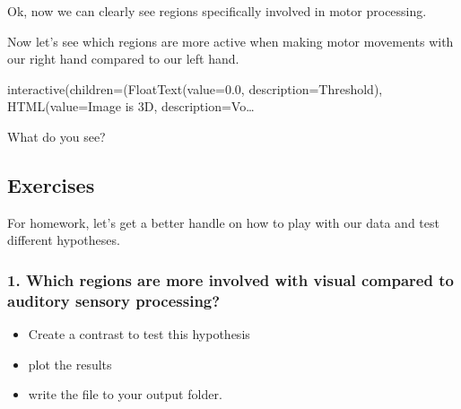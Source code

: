 \documentclass[letterpaper,10pt,english]{sphinxmanual}
\begin{document}
Ok, now we can clearly see regions specifically involved in motor processing.

Now let’s see which regions are more active when making motor movements with our right hand compared to our left hand.

\begin{sphinxVerbatim}[commandchars=\\\{\}]
  \PYG{p}{[}\PYG{p}{]}
\PYG{p}{[}\PYG{p}{[}\PYG{p}{]}\PYG{p}{]}  \PYG{p}{[}   \PYG{p}{]}

  \PYG{p}{[}\PYG{p}{]}  

\end{sphinxVerbatim}

\begin{sphinxVerbatim}[commandchars=\\\{\}]
interactive(children=(FloatText(value=0.0, description=\PYGZsq{}Threshold\PYGZsq{}), HTML(value=\PYGZsq{}Image is 3D\PYGZsq{}, description=\PYGZsq{}Vo…
\end{sphinxVerbatim}

What do you see?


\subsection{Exercises}
\label{\detokenize{content/GLM_Single_Subject_Model:exercises}}
For homework, let’s get a better handle on how to play with our data and test different hypotheses.


\subsubsection{1. Which regions are more involved with visual compared to auditory sensory processing?}
\label{\detokenize{content/GLM_Single_Subject_Model:which-regions-are-more-involved-with-visual-compared-to-auditory-sensory-processing}}\begin{itemize}
\item {} 
Create a contrast to test this hypothesis

\item {} 
plot the results

\item {} 
write the file to your output folder.

\end{itemize}
\end{document}

